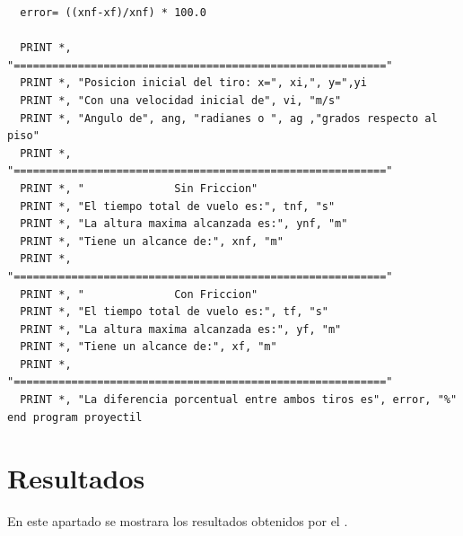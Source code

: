 \documentclass[12pt]{article}
\begin{document}
\begin{verbatim}
  error= ((xnf-xf)/xnf) * 100.0

  PRINT *, "=========================================================="
  PRINT *, "Posicion inicial del tiro: x=", xi,", y=",yi
  PRINT *, "Con una velocidad inicial de", vi, "m/s"
  PRINT *, "Angulo de", ang, "radianes o ", ag ,"grados respecto al piso"
  PRINT *, "=========================================================="
  PRINT *, "              Sin Friccion"
  PRINT *, "El tiempo total de vuelo es:", tnf, "s"
  PRINT *, "La altura maxima alcanzada es:", ynf, "m"
  PRINT *, "Tiene un alcance de:", xnf, "m"
  PRINT *, "=========================================================="
  PRINT *, "              Con Friccion"
  PRINT *, "El tiempo total de vuelo es:", tf, "s"
  PRINT *, "La altura maxima alcanzada es:", yf, "m"
  PRINT *, "Tiene un alcance de:", xf, "m"
  PRINT *, "=========================================================="
  PRINT *, "La diferencia porcentual entre ambos tiros es", error, "%"
end program proyectil

\end{verbatim}
\pagebreak
\section{Resultados}
En este apartado se mostrara los resultados obtenidos por el .
\end{document}
